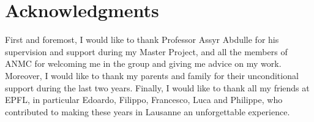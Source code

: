 \section*{Acknowledgments}

First and foremost, I would like to thank Professor Assyr Abdulle for his supervision and support during my Master Project, and all the members of ANMC for welcoming me in the group and giving me advice on my work. Moreover, I would like to thank my parents and family for their unconditional support during the last two years. Finally, I would like to thank all my friends at EPFL, in particular Edoardo, Filippo, Francesco, Luca and Philippe, who contributed to making these years in Lausanne an unforgettable experience.
